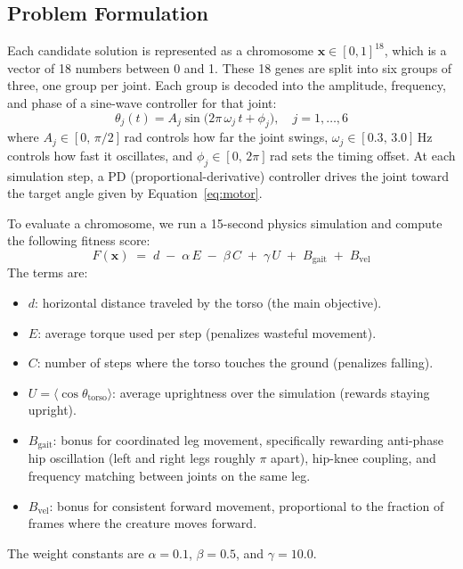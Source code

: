 \documentclass[11pt,a4paper]{article}
\begin{document}
\subsection{Problem Formulation}

Each candidate solution is represented as a chromosome $\mathbf{x} \in [0, 1]^{18}$, which is a vector of 18 numbers between 0 and 1. These 18 genes are split into six groups of three, one group per joint. Each group is decoded into the amplitude, frequency, and phase of a sine-wave controller for that joint:
%
\begin{equation}
\theta_j(t) = A_j \sin\!\big(2\pi\,\omega_j\, t + \phi_j\big), \quad j = 1, \ldots, 6
\label{eq:motor}
\end{equation}
%
where $A_j \in [0,\, \pi/2]$\,rad controls how far the joint swings, $\omega_j \in [0.3,\, 3.0]$\,Hz controls how fast it oscillates, and $\phi_j \in [0,\, 2\pi]$\,rad sets the timing offset. At each simulation step, a PD (proportional-derivative) controller drives the joint toward the target angle given by Equation~\ref{eq:motor}.

To evaluate a chromosome, we run a 15-second physics simulation and compute the following fitness score:
%
\begin{equation}
F(\mathbf{x}) \;=\; d \;-\; \alpha\, E \;-\; \beta\, C \;+\; \gamma\, U \;+\; B_{\mathrm{gait}} \;+\; B_{\mathrm{vel}}
\label{eq:fitness}
\end{equation}
%
The terms are:
\begin{itemize}[nosep,topsep=2pt]
    \item $d$: horizontal distance traveled by the torso (the main objective).
    \item $E$: average torque used per step (penalizes wasteful movement).
    \item $C$: number of steps where the torso touches the ground (penalizes falling).
    \item $U = \langle\cos\theta_{\mathrm{torso}}\rangle$: average uprightness over the simulation (rewards staying upright).
    \item $B_{\mathrm{gait}}$: bonus for coordinated leg movement, specifically rewarding anti-phase hip oscillation (left and right legs roughly $\pi$ apart), hip-knee coupling, and frequency matching between joints on the same leg.
    \item $B_{\mathrm{vel}}$: bonus for consistent forward movement, proportional to the fraction of frames where the creature moves forward.
\end{itemize}
The weight constants are $\alpha = 0.1$, $\beta = 0.5$, and $\gamma = 10.0$.
\end{document}
